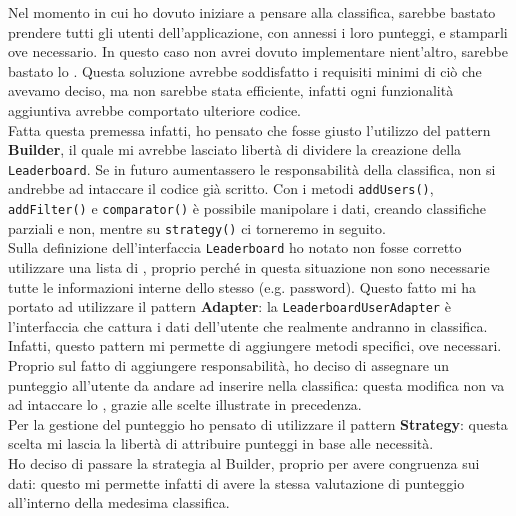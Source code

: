 \documentclass[a4paper,12pt]{report}
\begin{document}
Nel momento in cui ho dovuto iniziare a pensare alla classifica, sarebbe bastato prendere tutti gli utenti dell'applicazione, con annessi i loro punteggi, e stamparli ove necessario. In questo caso non avrei dovuto implementare nient'altro, sarebbe bastato lo \texttt{}. Questa soluzione avrebbe soddisfatto i requisiti minimi di ciò che avevamo deciso, ma non sarebbe stata efficiente, infatti ogni funzionalità aggiuntiva avrebbe comportato ulteriore codice.
\\
Fatta questa premessa infatti, ho pensato che fosse giusto l'utilizzo del pattern \textbf{Builder}, il quale mi avrebbe lasciato libertà di dividere la creazione della \texttt{Leaderboard}. Se in futuro aumentassero le responsabilità della classifica, non si andrebbe ad intaccare il codice già scritto.
Con i metodi \texttt{addUsers()}, \texttt{addFilter()} e \texttt{comparator()} è possibile manipolare i dati, creando classifiche parziali e non, mentre su \texttt{strategy()} ci torneremo in seguito.
\\
Sulla definizione dell'interfaccia \texttt{Leaderboard} ho notato non fosse corretto utilizzare una lista di \texttt{}, proprio perché in questa situazione non sono necessarie tutte le informazioni interne dello stesso (e.g. password). Questo fatto mi ha portato ad utilizzare il pattern \textbf{Adapter}: la \texttt{LeaderboardUserAdapter} è l'interfaccia che cattura i dati dell'utente che realmente andranno in classifica. Infatti, questo pattern mi permette di aggiungere metodi specifici, ove necessari.
\\
Proprio sul fatto di aggiungere responsabilità, ho deciso di assegnare un punteggio all'utente da andare ad inserire nella classifica: questa modifica non va ad intaccare lo \texttt{}, grazie alle scelte illustrate in precedenza.
\\
Per la gestione del punteggio ho pensato di utilizzare il pattern \textbf{Strategy}: questa scelta mi lascia la libertà di attribuire punteggi in base alle necessità.
\\
Ho deciso di passare la strategia al Builder, proprio per avere congruenza sui dati: questo mi permette infatti di avere la stessa valutazione di punteggio all'interno della medesima classifica.
\end{document}
